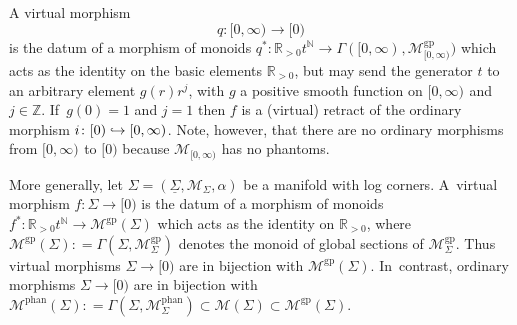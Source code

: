 \documentclass[JEP,XML,SOM,Unicode,NoFloatCountersInSection,published]{cedram}
\newcommand\hto{\mathrel{\lhook\joinrel\to}}
\theoremstyle{definition}
\theoremstyle{remark}
\newenvironment{example}
  {\pushQED{\qed}\renewcommand{\qedsymbol}{$\lozenge$}\examplex}
  {\popQED\endexamplex}
\newcommand{\RR}{\mathbb{R}}
\newcommand{\NN}{\mathbb{N}}
\newcommand{\ZZ}{\mathbb{Z}}
\newcommand{\halfspc}[1]{[0,\infty)^{#1}}
\newcommand{\defas}{\mathrel{\mathop:}=}
\newcommand{\cM}{\mathscr{M}}
\newcommand{\cMgp}{\mathscr{M}^{\mathrm{gp}}}
\newcommand{\cMphan}{\mathscr{M}^{\mathrm{phan}}}
\newcommand{\Sig}{\Sigma}
\newcommand{\uSig}{\underline{\Sigma}}
\newcommand{\sect}[1]{\mathsf{\Gamma}(#1)}
\begin{document}
\begin{example}\label{ex:weak-mor-retract-interval}
A virtual morphism
\[
q\colon \halfspc{}\to [0)
\]
is the datum of a morphism of monoids $q^*\colon \RR_{>0} t^{\NN}\to \sect{\halfspc{},\cMgp_{\halfspc{}}}$ which acts as the identity on the basic elements $\RR_{>0}$, but may send the generator $t$ to an arbitrary element $g(r)r^j$, with $g$ a positive smooth function on $\halfspc{}$ and $j\in\ZZ$. If~$g(0)=1$ and $j=1$ then $f$ is a (virtual) retract of the ordinary morphism $i\colon [0)\hto \halfspc{}$. Note, however, that there are no ordinary morphisms from $\halfspc{}$ to $[0)$ because $\cM_{\halfspc{}}$ has no phantoms.
\end{example}

\begin{example}
More generally, let $\Sig=(\uSig,\cM_\Sig,\alpha)$ be a manifold with log corners. A~virtual morphism $f:\Sig\to [0)$ is the datum of a morphism of monoids $f^*:\RR_{>0}t^\NN\to \cMgp(\Sig)$ which acts as the identity on $\RR_{>0}$, where $\cMgp(\Sig)\defas \sect{\Sig,\cMgp_\Sig}$ denotes the monoid of global sections of $\cMgp_\Sig$. Thus virtual morphisms $\Sig\to [0)$ are in bijection with $\cMgp(\Sig)$. In~contrast, ordinary morphisms $\Sig\to [0)$ are in bijection with $\cMphan(\Sig)\defas\sect{\Sig,\cMphan_\Sig} \subset \cM(\Sig)\subset \cMgp(\Sig)$.
\end{example}
\end{document}
